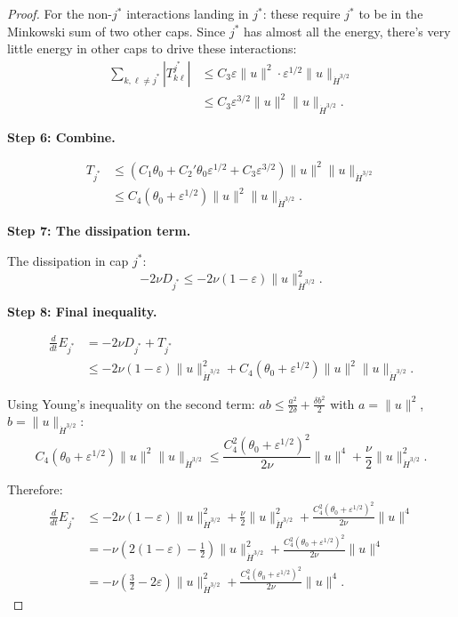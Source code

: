 \documentclass[11pt]{article}
\theoremstyle{definition}
\begin{document}
\begin{proof}
For the non-$j^*$ interactions landing in $j^*$: these require $j^*$ to be in the Minkowski sum of two other caps. Since $j^*$ has almost all the energy, there's very little energy in other caps to drive these interactions:
\begin{align}
\sum_{k, \ell \neq j^*} |T_{k\ell}^{j^*}| &\leq C_3 \varepsilon \|u\|^2 \cdot \varepsilon^{1/2} \|u\|_{\dot{H}^{3/2}} \\
&\leq C_3 \varepsilon^{3/2} \|u\|^2 \|u\|_{\dot{H}^{3/2}}.
\end{align}

\textbf{Step 6: Combine.}

\begin{align}
T_{j^*} &\leq (C_1 \theta_0 + C_2' \theta_0 \varepsilon^{1/2} + C_3 \varepsilon^{3/2}) \|u\|^2 \|u\|_{\dot{H}^{3/2}} \\
&\leq C_4 (\theta_0 + \varepsilon^{1/2}) \|u\|^2 \|u\|_{\dot{H}^{3/2}}.
\end{align}

\textbf{Step 7: The dissipation term.}

The dissipation in cap $j^*$:
\begin{equation}
-2\nu D_{j^*} \leq -2\nu (1-\varepsilon) \|u\|_{\dot{H}^{3/2}}^2.
\end{equation}

\textbf{Step 8: Final inequality.}

\begin{align}
\frac{d}{dt}E_{j^*} &= -2\nu D_{j^*} + T_{j^*} \\
&\leq -2\nu(1-\varepsilon)\|u\|_{\dot{H}^{3/2}}^2 + C_4(\theta_0 + \varepsilon^{1/2})\|u\|^2\|u\|_{\dot{H}^{3/2}}.
\end{align}

Using Young's inequality on the second term: $ab \leq \frac{a^2}{2\delta} + \frac{\delta b^2}{2}$ with $a = \|u\|^2$, $b = \|u\|_{\dot{H}^{3/2}}$:
\begin{equation}
C_4(\theta_0 + \varepsilon^{1/2})\|u\|^2\|u\|_{\dot{H}^{3/2}} \leq \frac{C_4^2(\theta_0 + \varepsilon^{1/2})^2}{2\nu}\|u\|^4 + \frac{\nu}{2}\|u\|_{\dot{H}^{3/2}}^2.
\end{equation}

Therefore:
\begin{align}
\frac{d}{dt}E_{j^*} &\leq -2\nu(1-\varepsilon)\|u\|_{\dot{H}^{3/2}}^2 + \frac{\nu}{2}\|u\|_{\dot{H}^{3/2}}^2 + \frac{C_4^2(\theta_0 + \varepsilon^{1/2})^2}{2\nu}\|u\|^4 \\
&= -\nu\left(2(1-\varepsilon) - \frac{1}{2}\right)\|u\|_{\dot{H}^{3/2}}^2 + \frac{C_4^2(\theta_0 + \varepsilon^{1/2})^2}{2\nu}\|u\|^4 \\
&= -\nu\left(\frac{3}{2} - 2\varepsilon\right)\|u\|_{\dot{H}^{3/2}}^2 + \frac{C_4^2(\theta_0 + \varepsilon^{1/2})^2}{2\nu}\|u\|^4.
\end{align}


\end{proof}
\end{document}
